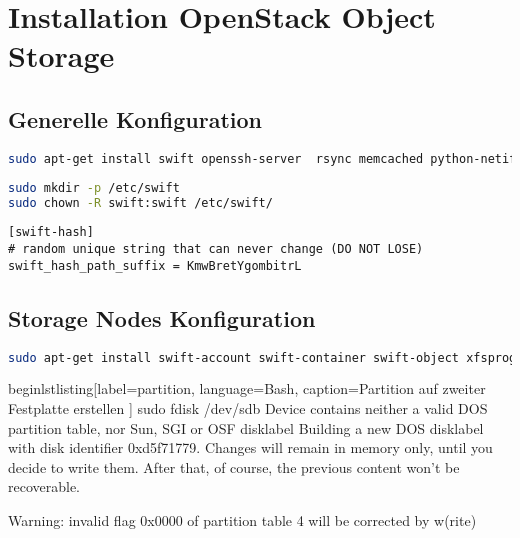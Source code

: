 \cleardoublepage
\chapter{Installation OpenStack Object Storage}
\section{Generelle Konfiguration}

\begin{lstlisting}[label=paketegenerell, language=Bash, caption=Installation generelle Host Pakete ]
sudo apt-get install swift openssh-server  rsync memcached python-netifaces python-xattr python-memcache 
\end{lstlisting}

\begin{lstlisting}[label=swiftconfdir, language=Bash, caption=Erstell /etc/swift Ordner und setzt Berechtigung ]
sudo mkdir -p /etc/swift
sudo chown -R swift:swift /etc/swift/
\end{lstlisting}


\begin{lstlisting}[label=swift.conf language=Bash, caption=Swift in /etc/swift/swift.conf konfigurieren]
[swift-hash]
# random unique string that can never change (DO NOT LOSE)
swift_hash_path_suffix = KmwBretYgombitrL
\end{lstlisting}

\section{Storage Nodes Konfiguration}

\begin{lstlisting}[label=paketenode, language=Bash, caption=Installation Data-Node Pakete ]
sudo apt-get install swift-account swift-container swift-object xfsprogs
\end{lstlisting}

begin{lstlisting}[label=partition, language=Bash, caption=Partition auf zweiter Festplatte erstellen ]
sudo fdisk /dev/sdb 
Device contains neither a valid DOS partition table, nor Sun, SGI or OSF disklabel
Building a new DOS disklabel with disk identifier 0xd5f71779.
Changes will remain in memory only, until you decide to write them.
After that, of course, the previous content won't be recoverable.

Warning: invalid flag 0x0000 of partition table 4 will be corrected by w(rite)

